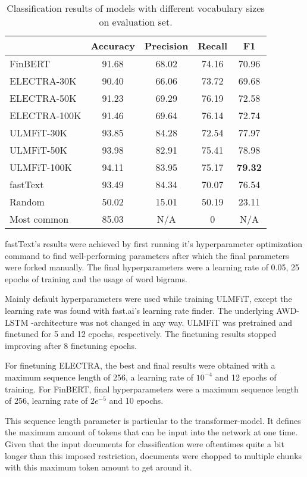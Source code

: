 \begin{table}[t]
\begin{center}
\begin{tabular}{lcccc}
         & Accuracy & Precision & Recall & F1 \\
        \hline
FinBERT &   91.68 &   68.02   &    74.16 &  70.96   \\
ELECTRA-30K    &  90.40 &   66.06 & 73.72 & 69.68 \\
ELECTRA-50K  &   91.23 &   69.29 & 76.19 & 72.58 \\
ELECTRA-100K  &  91.46 &   69.64 & 76.14 & 72.74 \\
ULMFiT-30K  &  93.85 &  84.28 & 72.54 & 77.97 \\
ULMFiT-50K  & 93.98 &  82.91 & 75.41 & 78.98 \\
ULMFiT-100K  & 94.11 & 83.95 & 75.17 & \textbf{79.32} \\
fastText &  93.49 & 84.34 & 70.07 & 76.54 \\
Random &  50.02 & 15.01 & 50.19 & 23.11 \\
Most common & 85.03 & N/A & 0 & N/A \\
\end{tabular}
\caption{Classification results of models with different vocabulary sizes on evaluation set.}
\label{table:results}
\end{center}
\end{table}

fastText's results were achieved by first running it's hyperparameter optimization command to find well-performing parameters after which the final parameters were forked manually.
The final hyperparameters were a learning rate of 0.05, 25 epochs of training and the usage of word bigrams.

Mainly default hyperparameters were used while training ULMFiT, except the learning rate was found with fast.ai's learning rate finder.
The underlying AWD-LSTM -architecture was not changed in any way.
ULMFiT was pretrained and finetuned for 5 and 12 epochs, respectively.
The finetuning results stopped improving after 8 finetuning epochs.

For finetuning ELECTRA, the best and final results were obtained with a maximum sequence length of 256, a learning rate of $10^{-4}$ and 12 epochs of training.
For FinBERT, final hyperparameters were a maximum sequence length of 256, learning rate of $2e^{-5}$ and 10 epochs.

This sequence length parameter is particular to the transformer-model.
It defines the maximum amount of tokens that can be input into the network at one time.
Given that the input documents for classification were oftentimes quite a bit longer than this imposed restriction, documents were chopped to multiple chunks with this maximum token amount to get around it.

